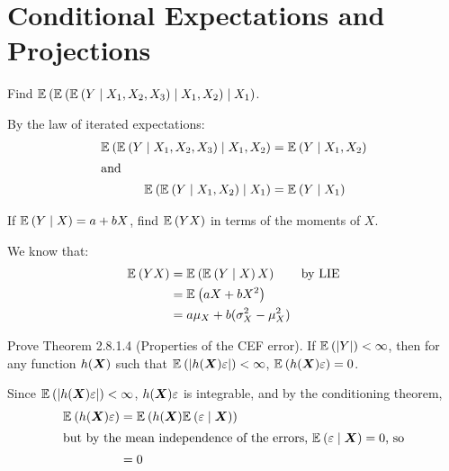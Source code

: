 \chapter{Conditional Expectations and Projections}

\begin{problem}
Find $\mathbb{E}_{}\left({\mathbb{E}_{}\left({\mathbb{E}_{}\left({Y \mid X_1, X_2, X_3}\right)\mid X_1, X_2}\right) \mid X_1}\right)$. 
\end{problem}

\begin{solution}
By the law of iterated expectations:
\begin{align}
 \mathbb{E}_{}\left({\mathbb{E}_{}\left({Y \mid X_1, X_2, X_3}\right)\mid X_1, X_2}\right) &= \mathbb{E}_{}\left({Y \mid X_1, X_2}\right) \\
 \intertext{and}
 \mathbb{E}_{}\left({\mathbb{E}_{}\left({Y \mid X_1, X_2}\right) \mid X_1}\right) &= \mathbb{E}_{}\left({Y \mid X_1}\right)
\end{align}
\end{solution}


\begin{problem}
If $\mathbb{E}_{}\left({Y \mid X}\right) = a + bX$, find $\mathbb{E}_{}\left({YX}\right)$ in terms of the moments of $X$.  
\end{problem}

\begin{solution}
 We know that:
 \begin{align}
  \mathbb{E}_{}\left({YX}\right) &= \mathbb{E}_{}\left({\mathbb{E}_{}\left({Y \mid X}\right)X}\right)\tag*{by LIE}\\
  &= \mathbb{E}_{}\left({aX + bX^2}\right) \\
  &= a\mu_X + b(\sigma^2_X - \mu_X^2)
 \end{align}
\end{solution}


\begin{problem}
Prove Theorem 2.8.1.4 (Properties of the CEF error). If $\mathbb{E}_{}\left({\left|Y\right|}\right) < \infty$, then for any function $h(\boldsymbol{X})$ such that $\mathbb{E}_{}\left({\left|h(\boldsymbol{X})\varepsilon\right|}\right) < \infty$, $\mathbb{E}_{}\left({h(\boldsymbol{X})\varepsilon}\right) = 0$. 
\end{problem}

\begin{solution}
 Since $\mathbb{E}_{}\left({\left|h(\boldsymbol{X})\varepsilon\right|}\right) < \infty$, $h(\boldsymbol{X})\varepsilon$ is integrable, and by the conditioning theorem, 
 \begin{align}
  \mathbb{E}_{}\left({h(\boldsymbol{X})\varepsilon}\right) &= \mathbb{E}_{}\left({h(\boldsymbol{X})\mathbb{E}_{}\left({\varepsilon\mid \boldsymbol{X}}\right)}\right)\\
  \intertext{but by the mean independence of the errors, $\mathbb{E}_{}\left({\varepsilon\mid \boldsymbol{X}}\right) = 0$, so}
  &= 0
 \end{align}
\end{solution}

